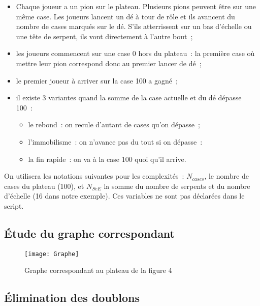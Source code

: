 \begin{itemize}
	\item Chaque joueur a un pion sur le plateau. Plusieurs pions peuvent être sur une même case. Les joueurs lancent un dé à tour de rôle et ils avancent du nombre de cases marqués sur le dé. S'ils atterrissent sur un bas d'échelle ou une tête de serpent, ils vont directement à l'autre bout~;
	\item les joueurs commencent sur une case 0 hors du plateau~: la première case où mettre leur pion correspond donc au premier lancer de dé~;
	\item le premier joueur à arriver sur la case 100 a gagné~; 
	\item il existe 3 variantes quand la somme de la case actuelle et du dé dépasse 100~:
	\begin{itemize}
		\item le rebond~: on recule d'autant de cases qu'on dépasse~;
		\item l'immobilisme~: on n'avance pas du tout si on dépasse~: 
		\item la fin rapide~: on va à la case 100 quoi qu'il arrive. 
	\end{itemize}
\end{itemize}

On utilisera les notations suivantes pour les complexités~: $N_{cases}$, le nombre de cases du plateau (100), et $N_{SeE}$ la somme du nombre de serpents et du nombre d'échelle (16 dans notre exemple). Ces variables ne sont pas déclarées dans le script.

\subsection*{Étude du graphe correspondant}

\begin{figure}[h]
	\begin{center}
		\texttt{[image: Graphe]}
	\end{center}
	\caption{Graphe correspondant au plateau de la figure 4}
	\label{fig:3}
\end{figure}


\subsection*{Élimination des doublons}


